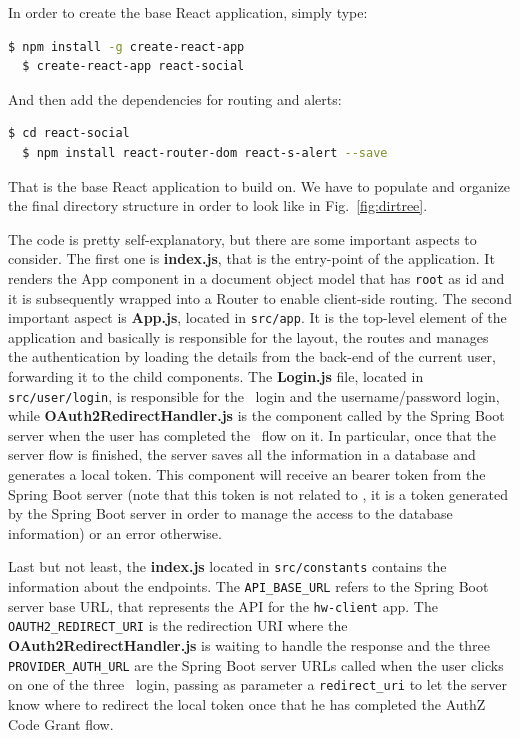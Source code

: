 \noindent In order to create the base React application, simply type:
\begin{lstlisting}[language=bash]
  $ npm install -g create-react-app
  $ create-react-app react-social
\end{lstlisting}

\noindent And then add the dependencies for routing and alerts:
\begin{lstlisting}[language=bash]
  $ cd react-social
  $ npm install react-router-dom react-s-alert --save
\end{lstlisting}

\noindent That is the base React application to build on. We have to populate and organize the final directory structure in order to look like in Fig.~\ref{fig:dirtree}.

The code is pretty self-explanatory, but there are some important aspects to consider. The first one is \textbf{index.js}, that is the entry-point of the application. It renders the App component in a document object model that has \texttt{root} as id and it is subsequently wrapped into a Router to enable client-side routing. The second important aspect is \textbf{App.js}, located in \texttt{src/app}. It is the top-level element of the application and basically is responsible for the layout, the routes and manages the authentication by loading the details from the back-end of the current user, forwarding it to the child components. The \textbf{Login.js} file, located in \texttt{src/user/login}, is responsible for the \oauth\ login and the username/password login, while \textbf{OAuth2RedirectHandler.js} is the component called by the Spring Boot server when the user has completed the \oauth\ flow on it. In particular, once that the server flow is finished, the server saves all the information in a database and generates a local token. This component will receive an bearer token from the Spring Boot server (note that this token is not related to \oauth, it is a token generated by the Spring Boot server in order to manage the access to the database information) or an error otherwise.

Last but not least, the \textbf{index.js} located in \texttt{src/constants} contains the information about the endpoints. The \texttt{API\_BASE\_URL} refers to the Spring Boot server base URL, that represents the API for the \texttt{hw-client} app. The \texttt{OAUTH2\_REDIRECT\_URI} is the redirection URI where the \\ \textbf{OAuth2RedirectHandler.js} is waiting to handle the response and the three \texttt{PROVIDER\_AUTH\_URL} are the Spring Boot server URLs called when the user clicks on one of the three \oauth\ login, passing as parameter a \texttt{redirect\_uri} to let the server know where to redirect the local token once that he has completed the AuthZ Code Grant flow. 

